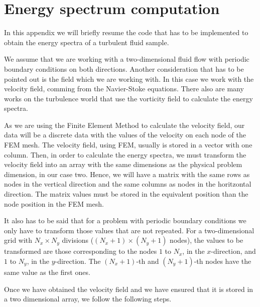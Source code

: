 
\chapter{Energy spectrum computation} %

\label{apenA-energy_spectrum_implementation} %

In this appendix we will briefly resume the code that has to be implemented to obtain the energy spectra of a turbulent fluid sample.

We assume that we are working with a two-dimensional fluid flow with periodic boundary conditions on both directions. Another consideration that has to be pointed out is the field which we are working with. In this case we work with the velocity field, comming from the Navier-Stoke equations. There also are many works on the turbulence world that use the vorticity field to calculate the energy spectra.

As we are using the Finite Element Method to calculate the velocity field, our data will be a discrete data with the values of the velocity on each node of the FEM mesh. The velocity field, using FEM, usually is stored in a vector with one column. Then, in order to calculate the energy spectra, we must transform the velocity field into an array with the same dimensions as the physical problem dimension, in our case two. Hence, we will have a matrix with the same rows as nodes in the vertical direction and the same columns as nodes in the horitzontal direction. The matrix values must be stored in the equivalent position than the node position in the FEM mesh.

It also has to be said that for a problem with periodic boundary conditions we only have to transform those values that are not repeated. For a two-dimensional grid with $N_x\times N_y$ divisions ($(N_x+1)\times(N_y+1)$ nodes), the values to be transformed are those corresponding to the nodes $1$ to $N_x$, in the $x$-direction, and $1$ to $N_y$, in the $y$-direction. The $(N_x+1)$-th and $(N_y+1)$-th nodes have the same value as the first ones.

Once we have obtained the velocity field and we have ensured that it is stored in a two dimensional array, we follow the following steps.

